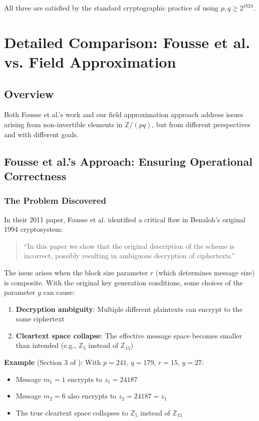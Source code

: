 \documentclass[11pt]{article}
\theoremstyle{definition}
\begin{document}
All three are satisfied by the standard cryptographic practice of using $p, q \geq 2^{1024}$.

\section{Detailed Comparison: Fousse et al. vs. Field Approximation}

\subsection{Overview}

Both Fousse et al.'s work \cite{fousse2011benaloh} and our field approximation approach address issues arising from non-invertible elements in $\mathbb{Z}/(pq)$, but from different perspectives and with different goals.

\subsection{Fousse et al.'s Approach: Ensuring Operational Correctness}

\subsubsection{The Problem Discovered}

In their 2011 paper, Fousse et al. identified a critical flaw in Benaloh's original 1994 cryptosystem:

\begin{quote}
``In this paper we show that the original description of the scheme is incorrect, possibly resulting in ambiguous decryption of ciphertexts.'' \cite{fousse2011benaloh}
\end{quote}

The issue arises when the block size parameter $r$ (which determines message size) is composite. With the original key generation conditions, some choices of the parameter $y$ can cause:
\begin{enumerate}
\item \textbf{Decryption ambiguity}: Multiple different plaintexts can encrypt to the same ciphertext
\item \textbf{Cleartext space collapse}: The effective message space becomes smaller than intended (e.g., $\mathbb{Z}_5$ instead of $\mathbb{Z}_{15}$)
\end{enumerate}

\textbf{Example} (Section 3 of \cite{fousse2011benaloh}): With $p = 241$, $q = 179$, $r = 15$, $y = 27$:
\begin{itemize}
\item Message $m_1 = 1$ encrypts to $z_1 = 24187$
\item Message $m_2 = 6$ also encrypts to $z_2 = 24187 = z_1$
\item The true cleartext space collapses to $\mathbb{Z}_5$ instead of $\mathbb{Z}_{15}$
\end{itemize}
\end{document}
